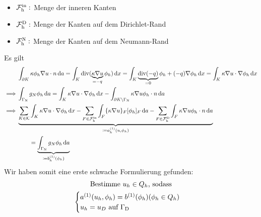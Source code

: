 \begin{notation}~
	\begin{itemize}
		\item $ \operatorname{\mathcal{F}_h^{\text{in}}}: $ Menge der inneren Kanten
		\item $ \operatorname{\mathcal{F}_h^{\text{D}}}: $ Menge der Kanten auf dem Dirichlet-Rand
		\item $ \operatorname{\mathcal{F}_h^{\text{N}}}: $ Menge der Kanten auf dem Neumann-Rand
	\end{itemize}
\end{notation}

Es gilt
\begin{align*}
	&\int_{\partial K} \kappa \phi_h \nabla u \cdot n \diff a = \int_K \dive(\underbrace{\kappa \nabla u}_{= -q} \phi_h) \diff x = \int_K \underbrace{\dive(-q)}_{=0} \phi_h + (-q) \nabla \phi_h \diff x = \int_K \kappa \nabla u \cdot \nabla \phi_h \diff x\\
	\implies &\int_{\GammaN} g_N \phi_h \diff a = \int_K \kappa \nabla u \cdot \nabla \phi_h \diff x - \int_{\partial K \setminus \GammaN} \kappa \nabla u \phi_h \cdot n \diff a\\
	\implies &\underbrace{\sum_{K \in \mathcal{K}} \int_K \kappa \nabla u \cdot \nabla \phi_h \diff x - \sum_{F \in \FIn} \int_{F} \{\kappa \nabla u \}_F [\phi_h]_F \diff a - \sum_{F \in \FD} \int_{F} \kappa \nabla u \phi_h \cdot n \diff a}_{\coloneqq a^{(1)}_h(u,\phi_h)}\\
	&\qquad = \underbrace{\int_{\GammaN} g_N \phi_h \diff a}_{\coloneqq b^{(1)}_h(\phi_h)}\\
\end{align*}
Wir haben somit eine erste schwache Formulierung gefunden:
\begin{gather*}
\text{Bestimme } u_h \in Q_h \text{, sodass}\\
\begin{cases}
	a^{(1)}(u_h,\phi_h) = b^{(1)}(\phi_h) (\phi_h \in Q_h)\\
	u_h = u_D \text{ auf }\Gamma_{\text{D}}
\end{cases}
\end{gather*}

